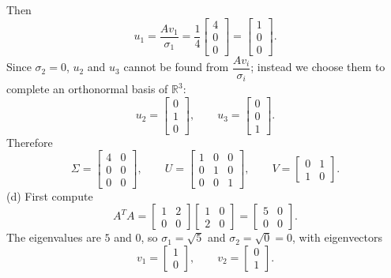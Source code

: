 \documentclass[11pt]{article}
\begin{document}
Then
$$
u_1 = \dfrac{Av_1}{\sigma_1} = \dfrac{1}{4}\begin{bmatrix} 4 \\ 0 \\ 0 \end{bmatrix}
= \begin{bmatrix} 1 \\ 0 \\ 0 \end{bmatrix}.
$$
Since $\sigma_2 = 0$, $u_2$ and $u_3$ cannot be found from $\dfrac{Av_i}{\sigma_i}$; instead we choose
them to complete an orthonormal basis of $\mathbb{R}^3$:
$$
u_2 = \begin{bmatrix} 0 \\ 1 \\ 0 \end{bmatrix}, \qquad
u_3 = \begin{bmatrix} 0 \\ 0 \\ 1 \end{bmatrix}.
$$
Therefore
$$
\Sigma = \begin{bmatrix} 4 & 0 \\ 0 & 0 \\ 0 & 0 \end{bmatrix}, \qquad
U = \begin{bmatrix} 1 & 0 & 0 \\ 0 & 1 & 0 \\ 0 & 0 & 1 \end{bmatrix}, \qquad
V = \begin{bmatrix} 0 & 1 \\ 1 & 0 \end{bmatrix}.
$$
\bigskip
(d)
First compute
$$
A^TA = \begin{bmatrix} 1 & 2 \\ 0 & 0 \end{bmatrix}
\begin{bmatrix} 1 & 0 \\ 2 & 0 \end{bmatrix}
= \begin{bmatrix} 5 & 0 \\ 0 & 0 \end{bmatrix}.
$$
The eigenvalues are $5$ and $0$, so $\sigma_1 = \sqrt{5}$ and $\sigma_2 = \sqrt{0} = 0$,
with eigenvectors
$$
v_1 = \begin{bmatrix} 1 \\ 0 \end{bmatrix}, \qquad
v_2 = \begin{bmatrix} 0 \\ 1 \end{bmatrix}.
$$
\end{document}
